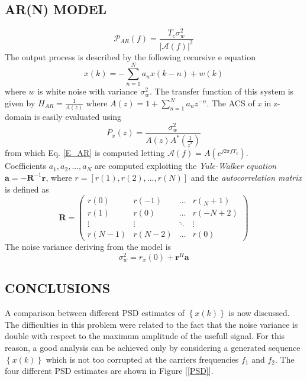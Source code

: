 \documentclass[a4paper,11pt,openright,twoside]{report}
\begin{document}
\subsection*{AR(N) MODEL}
\begin{equation}\label{E_AR}
\mathcal{P}_{AR}(f) = \frac{T_c \sigma_w^2}{\left | \mathcal{A}(f) \right |^2}
\end{equation}
The output process is described by the following recursive e equation
\begin{equation}\label{coeff}
x(k) = -\sum_{n=1}^{N} a_nx(k-n)+w(k)
\end{equation}
where $w$ is white noise with variance $\sigma_w^2$. The transfer function of this system is given by
$ H_{AR} = \frac{1}{A(z)} $ where $ A(z) = 1+\sum_{n=1}^Na_nz^{-n}$. The ACS of \textit{x} in z-domain is easily evaluated using 
\begin{equation*}
P_x(z) = \frac{\sigma_w^2}{A(z)A^*(\frac{1}{z^*})}
\end{equation*}
from which Eq. \ref{E_AR} is computed letting $\mathcal{A}(f) = A(e^{j2\pi f T_c})$. \\
Coefficients $a_1,a_2,...,a_N$ are computed exploiting the \textit{Yule-Walker equation}
 $\mathbf{a} = -\mathbf{R}^{-1}\mathbf{r}$, where $ r = \left[ r(1),r(2), \dots, r(N) \right] $ and the \textit{autocorrelation matrix} is defined as
\begin{equation*}
\mathbf{R} = \begin{pmatrix}
    r(0) & r(-1) & \dots & r(_N+1) \\
    r(1) & r(0) & \dots & r(-N+2) \\
    \vdots & \vdots & \ddots & \vdots \\
    r(N-1) & r(N-2) &  \dots & r(0)
    \end{pmatrix}
\end{equation*}
The noise variance deriving from the model is 
\begin{equation}\label{sigmaw}
\sigma_w^2 = r_x(0) + \mathbf{r}^H\mathbf{a}
\end{equation}

\subsection*{CONCLUSIONS}
A comparison between different PSD estimates of $ \left\lbrace x(k) \right\rbrace$ is now discussed. The difficulties in this problem were related to the fact that the noise variance is double with respect to the maximum amplitude of the usefull signal. For this reason, a good analysis can be achieved only by considering a generated sequence $ \left\lbrace x(k) \right\rbrace$ which is not too corrupted at the carriers frequencies $f_1$ and $f_2$. The four different PSD estimates are shown in Figure [\ref{PSD}]. \\
\end{document}
